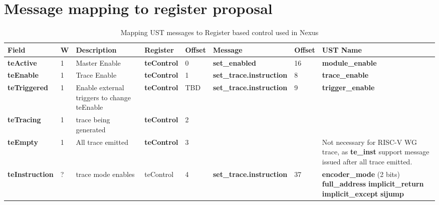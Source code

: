 \section{Message mapping to register proposal} \label{sec:messageToRegiser}

\begin{table}[htp]
  \tiny
  \centering
  \caption{Mapping UST messages to Register based control used in Nexus}
  \label{tab:te_control}
  \begin{tabulary}{\textwidth}{|l|l|p{15mm}|l|p{10mm}|l|p{15mm}|p{15mm}}

    \hline
    {\bf Field} & {\bf W} & {\bf Description} & {\bf Register} & {\bf Offset} & {\bf Message} & {\bf Offset} & {\bf UST Name} \\
    \hline
    \textbf {teActive} & 1 & Master Enable & \textbf {teControl} & 0 & \textbf {set\_enabled} & 16 & \textbf {module\_enable}\\
    \hline  
    \textbf {teEnable} & 1 & Trace Enable & \textbf{teControl} & 1 & \textbf {set\_trace.instruction} & 8 & \textbf {trace\_enable}\\     
    \hline
    \textbf{teTriggered} & 1 & Enable external triggers to change teEnable & \textbf {teControl} & TBD & \textbf {set\_trace.instruction} & 9 & \textbf {trigger\_enable}\\
    \hline
    \textbf{teTracing} & 1 & trace being generated & \textbf{teControl} & 2 & & \\
    \hline
    \textbf{teEmpty} & 1 & All trace emitted & \textbf{teControl} & 3 & & & Not necessary for RISC-V WG trace, as \textbf {te\_inst} support message issued after all trace emitted.\\
    \hline
    \textbf{teInstruction} & ? & trace mode enables & teControl & 4 & \textbf{set\_trace.instruction} & 37\newline & 
    \textbf {encoder\_mode} (2 bits)\newline
    \textbf{full\_address}\newline
    \textbf{implicit\_return}\newline
    \textbf{implicit\_except}\newline
    \textbf{sijump}\newline

\end{tabulary}
\end{table}
